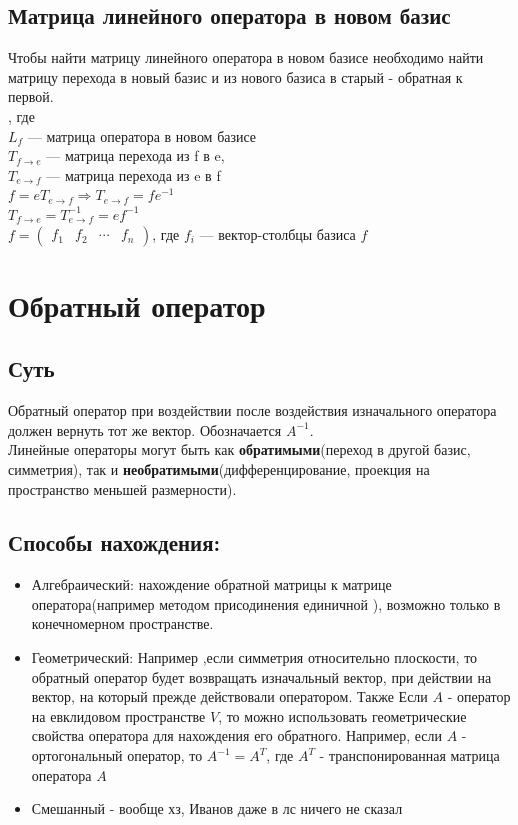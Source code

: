 \documentclass[12pt]{article}
\begin{document}
\subsection{Матрица линейного оператора в новом базис}
Чтобы найти матрицу линейного оператора в новом базисе необходимо найти матрицу перехода в новый базис и из нового базиса в старый - обратная к первой.\\
, где \\
$L_f$ --- матрица оператора в новом базисе\\ $T_{f\rightarrow e}$ --- матрица перехода из f в e, \\
$T_{e\rightarrow f}$ --- матрица перехода из e в f \\
$f = eT_{e \rightarrow f} \Rightarrow T_{e \rightarrow f} = fe^{-1}$ \\
$T_{f \rightarrow e} = T_{e \rightarrow f}^{-1} = ef^{-1}$ \\
$f = \begin{pmatrix}f_1 & f_2 & \cdots & f_n \end{pmatrix}$, где $f_i$ --- вектор-столбцы базиса $f$

\section{Обратный оператор}
\subsection{Суть}
Обратный оператор при воздействии после воздействия изначального оператора должен вернуть тот же вектор. Обозначается $A^{-1}$.\\ Линейные операторы могут быть как \textbf{обратимыми}(переход в другой базис, симметрия), так и \textbf{необратимыми}(дифференцирование, проекция на пространство меньшей размерности).
\subsection{Способы нахождения:}
\begin{itemize}
    \item Алгебраический: нахождение обратной матрицы к матрице оператора(например методом присодинения единичной ), возможно только в конечномерном пространстве.
    \item Геометрический: Например ,если симметрия относительно плоскости, то обратный оператор будет возвращать изначальный вектор, при действии на вектор, на который прежде действовали оператором. Также Если $A$ - оператор на евклидовом пространстве $V$, то можно использовать геометрические свойства оператора для нахождения его обратного. Например, если $A$ - ортогональный оператор, то $A^{-1} = A^T$, где $A^T$ - транспонированная матрица оператора $A$
    \item Смешанный - вообще хз, Иванов даже в лс ничего не сказал
\end{itemize}
\end{document}

